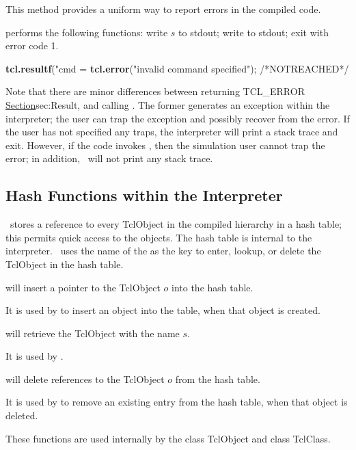 This method provides a uniform way to report errors in the compiled code.
\begin{list}{\textbullet}{}
\item {}
performs the following functions:
write $s$ to stdout; write  to stdout;
exit with error code 1.
\end{list}
\begin{program}
        {\bfseries{}tcl.resultf}("cmd = %
        {\bfseries{}tcl.error}("invalid command specified");
        /*{\cf{}NOTREACHED}*/
\end{program}

Note that
there are minor differences between returning TCL\_ERROR
\href{as we did in the previous subsection}{Section}{sec:Result},
and calling .
The former generates an exception within the interpreter;
the user can trap the exception and possibly recover from the error.
If the user has not specified any traps, 
the interpreter will print a stack trace and exit.
However, if the code invokes ,
then the simulation user cannot trap the error;
in addition, \ns\ will not print any stack trace.

\subsection{Hash Functions within the Interpreter}
\label{sec:HashTables}

\ns\ stores a reference to every TclObject in the compiled hierarchy
in a hash table;
this permits quick access to the objects.
The hash table is internal to the interpreter.
\ns\ uses the name of the  as the key
to enter, lookup, or delete the TclObject in the hash table.
\begin{list}{\textbullet}{}
\item {}
  will insert a pointer to the TclObject $o$ into the hash table.

  It is used by
  to insert an object into the table, when that object is created.

\item {}
  will retrieve the TclObject with the name $s$.

  It is used by
  .
\item {}
  will delete references to the TclObject $o$ from the hash table.

  It is used by
  to remove an existing entry from the hash table,
  when that object is deleted.
\end{list}
These functions are used internally by
the class TclObject and class TclClass.

